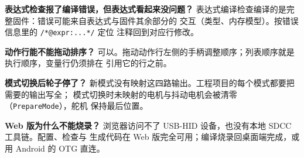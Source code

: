 \textbf{表达式检查报了编译错误，但表达式看起来没问题？}\quad
表达式编译检查编译的是完整固件：错误可能来自表达式与固件其余部分的
交互（类型、内存模型）。按错误信息里的 \texttt{/*@expr:...*/} 定位
注释回到对应行修改。

\textbf{动作行能不能拖动排序？}\quad
可以。拖动动作行左侧的手柄调整顺序；列表顺序就是执行顺序，变量行仍须排在
引用它的行之前。

\textbf{模式切换后轮子停了？}\quad
新模式没有映射这四路输出。工程项目的每个模式都要把需要的输出写全；
模式切换时未映射的电机与抖动电机会被清零（\texttt{PrepareMode}），舵机
保持最后位置。

\textbf{Web 版为什么不能烧录？}\quad
浏览器访问不了 USB-HID 设备，也没有本地 SDCC 工具链。配置、检查与
生成代码在 Web 版完全可用；编译烧录回桌面端完成，或用 Android 的
OTG 直连。

